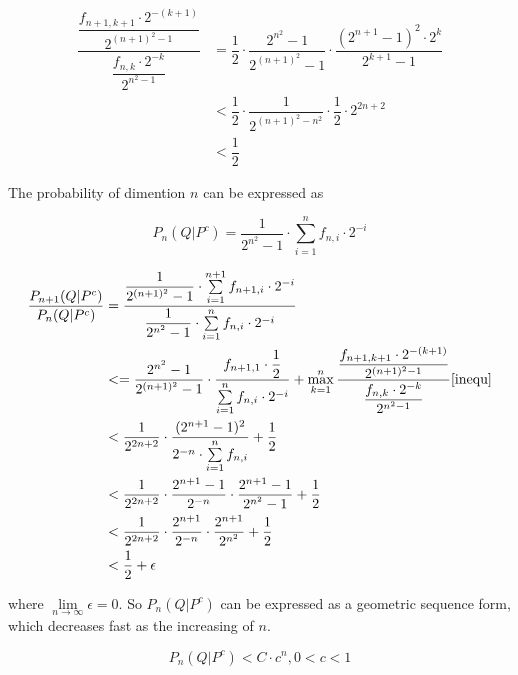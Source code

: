\begin{prob} 
	\begin{align*}\label{inequ}
		\dfrac{\dfrac{f_{n + 1, k + 1} \cdot 2 ^ {-(k + 1)}}{2^{(n + 1) ^ 2 - 1}}}
				{\dfrac{f_{n, k} \cdot 2 ^ {-k}}{2 ^ {n ^ 2 - 1}}} &= 
			\dfrac{1}{2} \cdot \dfrac{{2 ^ {n ^ 2}} - 1}{2 ^ {(n + 1) ^ 2} - 1} \cdot
				\dfrac{{(2 ^ {n + 1} - 1)} ^ 2 \cdot 2 ^ k}{2 ^ {k + 1} - 1} \\
			&< \dfrac{1}{2} \cdot \dfrac{1}{2 ^ {(n + 1) ^ 2 - n ^ 2}} \cdot 
				\dfrac{1}{2} \cdot 2 ^ {2n + 2} \\
			&< \dfrac{1}{2}
	\end{align*}
	
	The probability of dimention $n$ can be expressed as
	
	\begin{equation*}
		P_n(Q|P^c) = \dfrac{1}{2^{n^2} - 1} \cdot \sum\limits_{i = 1}^{n}f_{n, i} \cdot 2^{-i}
	\end{equation*}
	
	\begin{align*}
		\dfrac{P_{n + 1}(Q|P^c)}{P_{n}(Q|P^c)}
		 &= \dfrac{\dfrac{1}{2^{(n + 1)^2} - 1} \cdot \sum\limits_{i = 1}^{n + 1}f_{n + 1, i} \cdot 2^{-i}}
		 			{\dfrac{1}{2^{n^2} - 1} \cdot \sum\limits_{i = 1}^{n}f_{n, i} \cdot 2^{-i}} \\ 
		 &<= \dfrac{2^{n^2} - 1}{2^{(n + 1) ^ 2} - 1} \cdot \dfrac{f_{n + 1, 1} \cdot
		 	 \dfrac{1}{2}}{\sum\limits_{i = 1}^{n}f_{n, i} \cdot 2^{-i}} + 
	 	 	 \max_{k = 1}^{n} \dfrac{\dfrac{f_{n + 1, k + 1} \cdot 2 ^ {-(k + 1)}}
	 	 	 	{2^{(n + 1) ^ 2 - 1}}}{\dfrac{f_{n, k} \cdot 2 ^ {-k}}{2 ^ {n ^ 2 - 1}}} \ref{inequ} \\
 	 	 &< \dfrac{1}{2 ^ {2n + 2}} \cdot \dfrac{(2 ^ {n + 1} - 1) ^ 2}
 	 	 	{2^{-n} \cdot \sum\limits_{i = 1}^{n}f_{n, i}} + \dfrac{1}{2} \\
 	 	 &< \dfrac{1}{2^{2n + 2}} \cdot \dfrac{2^{n + 1} - 1}{2 ^ {-n}} \cdot 
 	 	 	\dfrac{2 ^ {n + 1} - 1}{2^{n^2} - 1} + \dfrac{1}{2}\\
 	 	 &< \dfrac{1}{2^{2n + 2}} \cdot \dfrac{2^{n + 1}}{2 ^ {-n}} \cdot 
 	 	 \dfrac{2 ^ {n + 1}}{2^{n^2}} + \dfrac{1}{2}\\
 	 	 &< \dfrac{1}{2} + \epsilon
	\end{align*}
	
	where $\lim\limits_{n \to \infty} \epsilon = 0$. So $P_n(Q|P^c)$ can be expressed as a geometric sequence form, which decreases fast as the increasing of $n$.
	
	\begin{equation}
		P_n(Q|P^c) < C \cdot c^n, 0 < c < 1
	\end{equation}
	

\end{prob}
